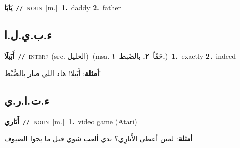 \documentclass[10pt,a4paper,twoside]{article} %
\begin{document}
\begin{multicols}{2}
{{{\setlength\topsep{0pt}\textbf{\foreignlanguage{arabic}{يَابَا}}\ {\color{gray}\texttt{//}\color{black}}\ \textsc{noun}\ [m.]\ \textbf{1.}~daddy  \textbf{2.}~father\ 

\vspace{-3mm}
\subsection*{\color{blue}\foreignlanguage{arabic}{ء.ب.ي.ل.ا}\color{blue}{ (ntws)}} 

{\setlength\topsep{0pt}\textbf{\foreignlanguage{arabic}{أَبَيلَا}}\ {\color{gray}\texttt{//}\color{black}}\ \textsc{interj}\ (src. \color{gray}\foreignlanguage{arabic}{الخليل}\color{black})\ \color{gray}(msa. \foreignlanguage{arabic}{حَقّاً}~\foreignlanguage{arabic}{\textbf{٢.}}  \foreignlanguage{arabic}{بالضّبط}~\foreignlanguage{arabic}{\textbf{١.}})\color{black}\ \textbf{1.}~exactly  \textbf{2.}~indeed\  \begin{flushright}\color{gray}\foreignlanguage{arabic}{\textbf{\underline{\foreignlanguage{arabic}{أمثلة}}}: أَبَيلا! هاد اللي صار بالضَّبْط!}\end{flushright}\color{black}} \vspace{2mm}

\vspace{-3mm}
\subsection*{\color{blue}\foreignlanguage{arabic}{ء.ت.ا.ر.ي}\color{blue}{ (ntws)}} 

{\setlength\topsep{0pt}\textbf{\foreignlanguage{arabic}{أَتَاري}}\ {\color{gray}\texttt{//}\color{black}}\ \textsc{noun}\ [m.]\ \textbf{1.}~video game (Atari)\  \begin{flushright}\color{gray}\foreignlanguage{arabic}{\textbf{\underline{\foreignlanguage{arabic}{أمثلة}}}: لمين أعطى الأَتارِي؟ بدي ألعب شوي قبل ما يجوا الضيوف}\end{flushright}\color{black}} \vspace{2mm}

}}}
\end{multicols}
\end{document}
